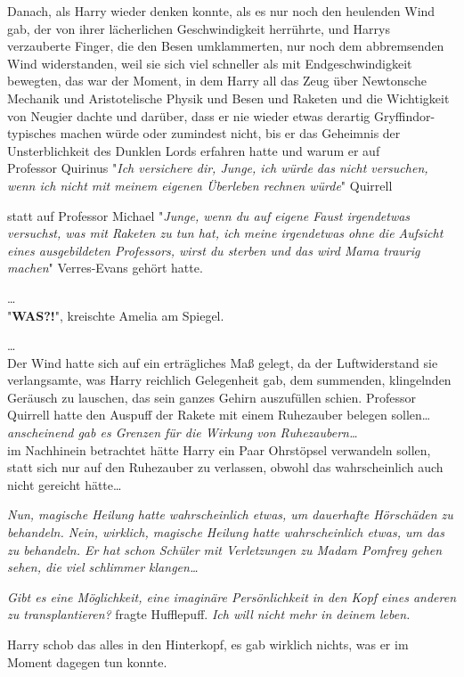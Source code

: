 {Danach, als Harry wieder denken konnte, als es nur noch den heulenden Wind gab, der von ihrer lächerlichen Geschwindigkeit herrührte, und Harrys verzauberte Finger, die den Besen umklammerten, nur noch dem abbremsenden Wind widerstanden, weil sie sich viel schneller als mit Endgeschwindigkeit bewegten, das war der Moment, in dem Harry all das Zeug über Newtonsche Mechanik und Aristotelische Physik und Besen und Raketen und die Wichtigkeit von Neugier dachte und darüber, dass er nie wieder etwas derartig Gryffindor-typisches machen würde oder zumindest nicht, bis er das Geheimnis der Unsterblichkeit des Dunklen Lords erfahren hatte und warum er auf\\ Professor Quirinus "\emph{Ich versichere dir, Junge, ich würde das nicht versuchen, wenn ich nicht mit meinem eigenen Überleben rechnen würde}" Quirrell

statt auf Professor Michael "\emph{Junge, wenn du auf eigene Faust irgendetwas versuchst, was mit Raketen zu tun hat, ich meine irgendetwas ohne die Aufsicht eines ausgebildeten Professors, wirst du sterben und das wird Mama traurig machen}" Verres-Evans gehört hatte.

…\\ "\textbf{WAS?!}", kreischte Amelia am Spiegel.

…\\ Der Wind hatte sich auf ein erträgliches Maß gelegt, da der Luftwiderstand sie verlangsamte, was Harry reichlich Gelegenheit gab, dem summenden, klingelnden Geräusch zu lauschen, das sein ganzes Gehirn auszufüllen schien. Professor Quirrell hatte den Auspuff der Rakete mit einem Ruhezauber belegen sollen…\\ \emph{anscheinend gab es Grenzen für die Wirkung von Ruhezaubern…}\\ im Nachhinein betrachtet hätte Harry ein Paar Ohrstöpsel verwandeln sollen, statt sich nur auf den Ruhezauber zu verlassen, obwohl das wahrscheinlich auch nicht gereicht hätte…

\emph{Nun, magische Heilung hatte wahrscheinlich etwas, um dauerhafte Hörschäden zu behandeln. Nein, wirklich, magische Heilung hatte wahrscheinlich etwas, um das zu behandeln. Er hat schon Schüler mit Verletzungen zu Madam Pomfrey gehen sehen, die viel schlimmer klangen…}

\emph{Gibt es eine Möglichkeit, eine imaginäre Persönlichkeit in den Kopf eines anderen zu transplantieren?} fragte Hufflepuff. \emph{Ich will nicht mehr in deinem leben.}

Harry schob das alles in den Hinterkopf, es gab wirklich nichts, was er im Moment dagegen tun konnte.

}
